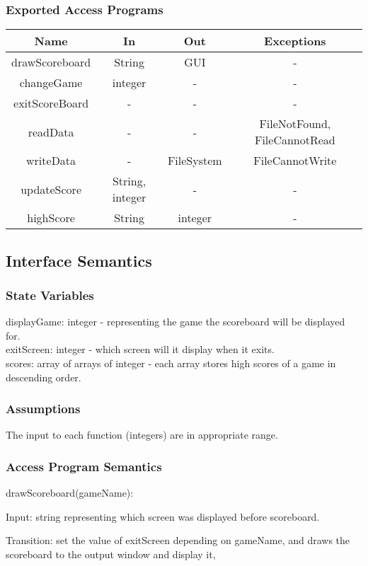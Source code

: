 \documentclass[12pt, titlepage]{article}
\begin{document}
		\subsubsection{Exported Access Programs}
		\begin{tabular}[pos]{|c|c|c|c|}
			\hline
			\textbf{Name}& \textbf{In} & \textbf{Out} & \textbf{Exceptions} \\ \hline
			drawScoreboard & String & GUI & - \\ \hline
			changeGame & integer & - & - \\ \hline
			exitScoreBoard & - & - & - \\ \hline
			readData & - & - & FileNotFound, FileCannotRead \\ \hline
			writeData & - & FileSystem & FileCannotWrite \\ \hline
			updateScore & String, integer & - & - \\ \hline
			highScore & String & integer & - \\ \hline
		\end{tabular}
		\subsection{Interface Semantics}
		\subsubsection{State Variables}
		displayGame: integer - representing the game the scoreboard will be displayed for.\\
		exitScreen: integer - which screen will it display when it exits.\\
		scores: array of arrays of integer - each array stores high scores of a game in descending order.
		\subsubsection{Assumptions}
		The input to each function (integers) are in appropriate range.
		\subsubsection{Access Program Semantics}
		
		drawScoreboard(gameName):
		
		Input: string representing which screen was displayed before scoreboard.
		
		Transition: set the value of exitScreen depending on gameName, and draws the scoreboard to the output window and display it,
		
\end{document}
